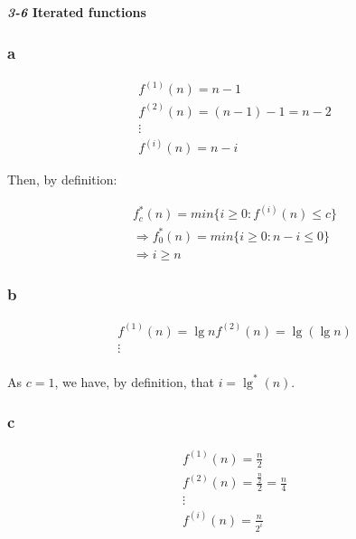 \documentclass[8pt,a4paper]{article}
\begin{document}
\begin{framed}
  \textbf{\textit{3-6} Iterated functions}
\end{framed}

\subsubsection*{a}

\begin{equation*}
  \begin{split}
    f^{(1)}(n) = n - 1 \\
    f^{(2)}(n) = (n - 1) - 1 = n -2 \\
    \vdots \\
    f^{(i)}(n) = n - i
  \end{split}
\end{equation*}

  Then, by definition:

\begin{equation*}
  \begin{split}
    f_{c}^{*}(n) = min \{ i \geq 0 : f^{(i)}(n) \leq c \} \\
    \Rightarrow f_{0}^{*}(n) = min \{ i \geq 0 : n - i \leq 0 \} \\
    \Rightarrow i \geq n
  \end{split}
\end{equation*}

\subsubsection*{b}

\begin{equation*}
  \begin{split}
    f^{(1)}(n) = \lg n
    f^{(2)}(n) = \lg(\lg n) \\
    \vdots \\
  \end{split}
\end{equation*}

  As $c = 1$, we have, by definition, that $i = \lg^{*}(n)$.

\subsubsection*{c}

\begin{equation*}
  \begin{split}
    f^{(1)}(n) = \frac{n}{2} \\
    f^{(2)}(n) = \frac{\frac{n}{2}}{2} = \frac{n}{4} \\
    \vdots \\
    f^{(i)}(n) = \frac{n}{2^{i}}
  \end{split}
\end{equation*}
\end{document}
